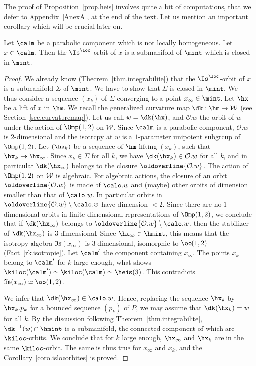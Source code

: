 The proof of Proposition~\ref{prop.heis} involves quite a bit of computations, that we defer to Appendix~\ref{AnexA}, at the end of the text. Let us mention an important corollary which will be crucial later on.

\begin{coro}\label{coro.islocorbites}
Let $\calm$ be a parabolic component which is not locally homogeneous. Let $x \in \calm$. Then the $\Is^{\loc}$-orbit of $x$ is a submanifold of $\mint$ which is closed in $\mint$.
\end{coro}

\begin{proof}
We already know (Theorem~\ref{thm.integrabilite}) that the $\Is^{\loc}$-orbit of $x$ is a submanifold $\Sigma$ of $\mint$. We have to show that $\Sigma$ is closed in $\mint$. We thus consider a sequence $(x_k)$ of $\Sigma$ converging to a point $x_{\infty} \in \mint$. Let $\hx$ be a lift of $x$ in $\hm$. We recall the generalized curvature map $\dk: \hm \to \mathcal{W}$ (see Section~\ref{sec.curvaturemap}). Let us call $w=\dk(\hx)$, and $\mathcal{O}.w$ the orbit of $w$ under the action of $\Omp(1,2)$ on $\mathcal{W}$. Since $\calm$ is a parabolic component, $\mathcal{O}.w$ is $2$-dimensional and the isotropy at $w$ is a $1$-parameter unipotent subgroup of $\Omp(1,2)$. Let $(\hx_k)$ be a sequence of $\hm$ lifting $(x_k)$, such that $\hx_k \to \hx_{\infty}$. Since $x_k \in \Sigma$ for all $k$, we have $\dk(\hx_k) \in \mathcal{O}.w$ for all $k$, and in particular $\dk(\hx_{\infty})$ belongs to the closure $\oldoverline{\mathcal{O}.w}$. The action of $\Omp(1,2)$ on $\mathcal{W}$ is algebraic. For algebraic actions, the closure of an orbit $\oldoverline{\mathcal{O}.w}$ is made of $\calo.w$ and (maybe) other orbits of dimension smaller than that of $\calo.w$. In particular orbits in $\oldoverline{\mathcal{O}.w} \setminus \calo.w$ have dimension $<2$. Since there are no $1$-dimensional orbits in finite dimensional representations of $\Omp(1,2)$, we conclude that if $\dk(\hx_{\infty})$ belongs to $\oldoverline{\mathcal{O}.w} \setminus \calo.w$, then the stabilizer of $\dk(\hx_{\infty})$ is $3$-dimensional. Since $\hx_{\infty} \in \hmint$, this means that the isotropy algebra $\mathfrak{Is}(x_{\infty})$ is $3$-dimensional, isomorphic to $\oo(1,2)$ (Fact~\ref{rk.isotropie}). Let $\calm'$ the component containing $x_{\infty}$. The points $x_k$ belong to $\calm'$ for $k$ large enough, what shows $\kiloc(\calm') \simeq \kiloc(\calm)\simeq \heis(3)$. This contradicts $\mathfrak{Is}(x_{\infty}) \simeq \oo(1,2)$.

We infer that $\dk(\hx_{\infty}) \in \calo.w$. Hence, replacing the sequence $\hx_k$ by $\hx_k.p_k$ for a bounded sequence $(p_k)$ of $P$, we may assume that $\dk(\hx_k)=w$ for all $k$. By the discussion following Theorem~\ref{thm.integrabilite}, $\dk^{-1}(w) \cap \hmint$ is a submanifold, the connected component of which are $\kiloc$-orbits. We conclude that for $k$ large enough, $\hx_{\infty}$ and $\hx_k$ are in the same $\kiloc$-orbit. The same is thus true for $x_{\infty}$ and $x_k$, and the Corollary~\ref{coro.islocorbites} is proved.
\end{proof}


